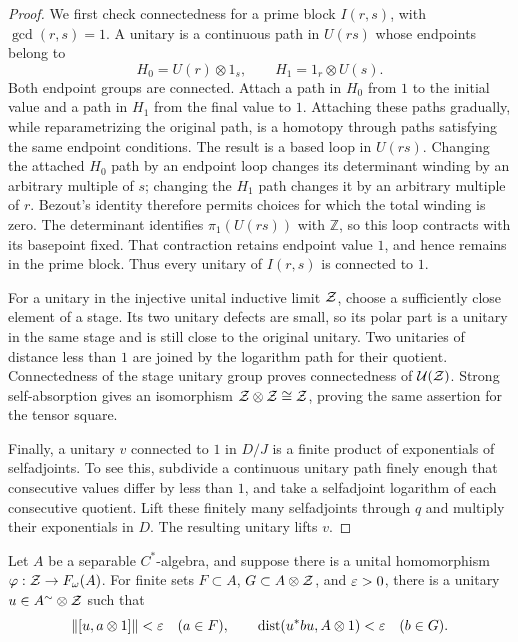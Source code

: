 \begin{proof}
We first check connectedness for a prime block $I(r,s)$, with
$\gcd(r,s)=1$.  A unitary is a continuous path in $U(rs)$ whose
endpoints belong to
\[
 H_0=U(r)\otimes1_s,\qquad H_1=1_r\otimes U(s).
\]
Both endpoint groups are connected.  Attach a path in $H_0$ from
$1$ to the initial value and a path in $H_1$ from the final value
to $1$.  Attaching these paths gradually, while reparametrizing the
original path, is a homotopy through paths satisfying the same
endpoint conditions.  The result is a based loop in $U(rs)$.
Changing the attached $H_0$ path by an endpoint loop changes its
determinant winding by an arbitrary multiple of $s$; changing the
$H_1$ path changes it by an arbitrary multiple of $r$.  Bezout's
identity therefore permits choices for which the total winding is
zero.  The determinant identifies $\pi_1(U(rs))$ with $\mathbb Z$,
so this loop contracts with its basepoint fixed.  That contraction
retains endpoint value $1$, and hence remains in the prime block.
Thus every unitary of $I(r,s)$ is connected to $1$.

For a unitary in the injective unital inductive limit $\mathcal Z$, choose
a sufficiently close element of a stage.  Its two unitary defects
are small, so its polar part is a unitary in the same stage and is
still close to the original unitary.  Two unitaries of distance less
than $1$ are joined by the logarithm path for their quotient.
Connectedness of the stage unitary group proves connectedness of
$\mathcal U(\mathcal Z)$.  Strong self-absorption gives an isomorphism
$\mathcal Z\otimes\mathcal Z\cong\mathcal Z$, proving the same assertion for the tensor
square.

Finally, a unitary $v$ connected to $1$ in $D/J$ is a finite product
of exponentials of selfadjoints.  To see this, subdivide a continuous
unitary path finely enough that consecutive values differ by less
than $1$, and take a selfadjoint logarithm of each consecutive
quotient.  Lift these finitely many selfadjoints through $q$ and
multiply their exponentials in $D$.  The resulting unitary lifts $v$.
\end{proof}

\begin{lemma}\label{abs:finite-unitary-criterion}
Let $A$ be a separable $C^*$-algebra, and suppose there is a unital
homomorphism $\varphi:\mathcal Z\to F_\omega(A)$.
For finite sets $F\subset A$, $G\subset A\otimes\mathcal Z$, and
$\varepsilon>0$, there is a unitary $u\in A^{\sim}\otimes\mathcal Z$ such that
\begin{equation}\label{abs:unitary-criterion}
 \|[u,a\otimes1]\|<\varepsilon\quad(a\in F),\qquad
 \operatorname{dist}(u^*bu,A\otimes1)<\varepsilon\quad(b\in G).
\end{equation}
\end{lemma}

